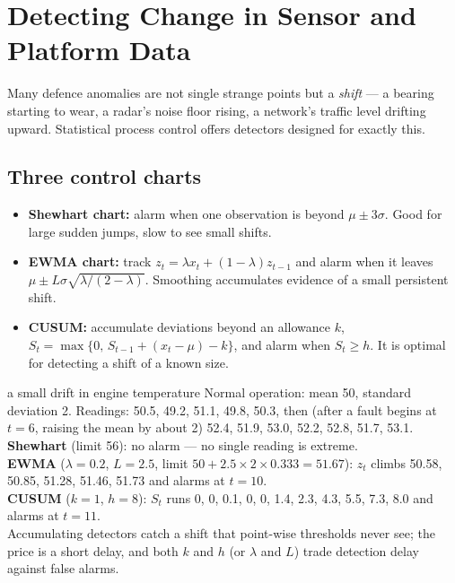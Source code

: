 \documentclass[11pt]{article}
\begin{document}
\section{Detecting Change in Sensor and Platform Data}
Many defence anomalies are not single strange points but a \emph{shift} --- a bearing starting to wear, a radar's noise floor rising, a network's traffic level drifting upward. Statistical process control offers detectors designed for exactly this.
\subsection{Three control charts}
\begin{itemize}
\item \textbf{Shewhart chart:} alarm when one observation is beyond $\mu\pm3\sigma$. Good for large sudden jumps, slow to see small shifts.
\item \textbf{EWMA chart:} track $z_t=\lambda x_t+(1-\lambda)z_{t-1}$ and alarm when it leaves $\mu\pm L\sigma\sqrt{\lambda/(2-\lambda)}$. Smoothing accumulates evidence of a small persistent shift.
\item \textbf{CUSUM:} accumulate deviations beyond an allowance $k$, $S_t=\max\{0,\,S_{t-1}+(x_t-\mu)-k\}$, and alarm when $S_t\ge h$. It is optimal for detecting a shift of a known size.
\end{itemize}
\begin{example}{a small drift in engine temperature}
Normal operation: mean 50, standard deviation 2. Readings: 50.5, 49.2, 51.1, 49.8, 50.3, then (after a fault begins at $t=6$, raising the mean by about 2) 52.4, 51.9, 53.0, 52.2, 52.8, 51.7, 53.1.\\
\textbf{Shewhart} (limit 56): no alarm --- no single reading is extreme.\\
\textbf{EWMA} ($\lambda=0.2$, $L=2.5$, limit $50+2.5\times2\times0.333=51.67$): $z_t$ climbs 50.58, 50.85, 51.28, 51.46, 51.73 and alarms at $t=10$.\\
\textbf{CUSUM} ($k=1$, $h=8$): $S_t$ runs 0, 0, 0.1, 0, 0, 1.4, 2.3, 4.3, 5.5, 7.3, 8.0 and alarms at $t=11$.\\
Accumulating detectors catch a shift that point-wise thresholds never see; the price is a short delay, and both $k$ and $h$ (or $\lambda$ and $L$) trade detection delay against false alarms.
\end{example}
\end{document}

